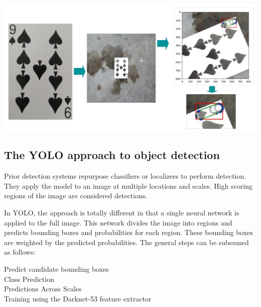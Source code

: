 \documentclass[a0,landscape]{a0poster}
\begin{document}
\begin{multicols}{3}
\vspace{1cm}
\begin{minipage}[b]{0.30\textwidth}
\includegraphics[width=\textwidth]{7-p}
\end{minipage}

\subsection*{The YOLO approach to object detection}

Prior detection systems repurpose classifiers or localizers to perform detection. They apply the model to an image at multiple locations and scales. High scoring regions of the image are considered detections.

In YOLO, the approach is totally different in that a single neural network is applied to the full image. This network divides the image into regions and predicts bounding boxes and probabilities for each region. These bounding boxes are weighted by the predicted probabilities. The general steps can be subsumed as follows:
\begin{description}
\item[Predict candidate bounding boxes]
\item[Class Prediction]
\item[Predictions Across Scales]
\item[Training using the Darknet-53 feature extractor]
\end{description}

\end{multicols}
\end{document}
